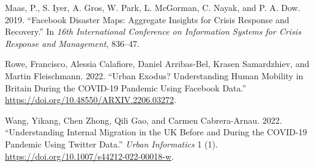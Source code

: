 \documentclass[11pt,letterpaper]{article}
\newlength{\cslhangindent}
\newlength{\cslentryspacingunit} %
\newenvironment{CSLReferences}[2] %
 {%
  \setlength{\parindent}{0pt}
  \ifodd #1
  \let\oldpar\par
  \def\par{\hangindent=\cslhangindent\oldpar}
  \fi
  \setlength{\parskip}{#2\cslentryspacingunit}
 }%
 {}
\begin{document}
\label{refs}
\begin{CSLReferences}{1}{0}
Maas, P., S. Iyer, A. Gros, W. Park, L. McGorman, C. Nayak, and P. A.
Dow. 2019. {``Facebook Disaster Maps: Aggregate Insights for Crisis
Response and Recovery.''} In \emph{16th International Conference on
Information Systems for Crisis Response and Management}, 836--47.

Rowe, Francisco, Alessia Calafiore, Daniel Arribas-Bel, Krasen
Samardzhiev, and Martin Fleischmann. 2022. {``Urban Exodus?
Understanding Human Mobility in Britain During the COVID-19 Pandemic
Using Facebook Data.''} \url{https://doi.org/10.48550/ARXIV.2206.03272}.

Wang, Yikang, Chen Zhong, Qili Gao, and Carmen Cabrera-Arnau. 2022.
{``Understanding Internal Migration in the UK Before and During the
COVID-19 Pandemic Using Twitter Data.''} \emph{Urban Informatics} 1 (1).
\url{https://doi.org/10.1007/s44212-022-00018-w}.

\end{CSLReferences}




\setlength{\bibsep}{0.00cm plus 0.05cm} %


\end{document}
